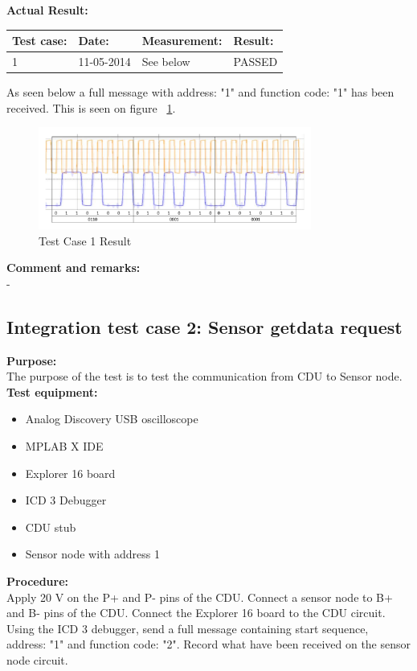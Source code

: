 \textbf{Actual Result:}\\
\begin{table}[H]
\centering
\begin{tabular}{|p{2cm}|p{2cm}|p{3cm}|p{2cm}|}\hline
\textbf{Test case:} & \textbf{Date:} & \textbf{Measurement:} & \textbf{Result:} \\ \hline
1 & 11-05-2014 & See below & PASSED \\ \hline
\end{tabular}
\end{table}
As seen below a full message with address: "1" and function code: "1" has been received. This is seen on figure ~\ref{fig:InteTestCase1}.
\begin{figure}[H]
\centering
\includegraphics[width=0.8\textwidth]{billeder/CDUtestcase9}
\caption{Test Case 1 Result}
\label{fig:InteTestCase1}
\end{figure}

\textbf{Comment and remarks:}\\
-\\

\subsection{Integration test case 2: Sensor getdata request}
\textbf{Purpose:}\\
The purpose of the test is to test the communication from CDU to Sensor node.\\

\textbf{Test equipment:}
\begin{itemize}
\item Analog Discovery USB oscilloscope
\item MPLAB X IDE
\item Explorer 16 board
\item ICD 3 Debugger
\item CDU stub
\item Sensor node with address 1
\end{itemize}

\textbf{Procedure:}\\
Apply 20 V on the P+ and P- pins of the CDU. Connect a sensor node to B+ and B- pins of the CDU. Connect the Explorer 16 board to the CDU circuit. Using the ICD 3 debugger, send a full message containing start sequence, address: "1" and function code: "2". Record what have been received on the sensor node circuit.\\

